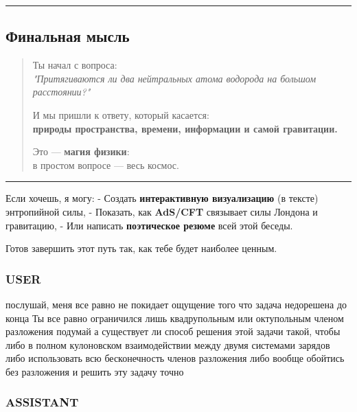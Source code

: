 \documentclass[11pt]{article}
\begin{document}
\begin{center}\rule{0.5\linewidth}{\linethickness}\end{center}

\subsection{Финальная
мысль}\label{ux444ux438ux43dux430ux43bux44cux43dux430ux44f-ux43cux44bux441ux43bux44c}

\begin{quote}
Ты начал с вопроса:\\
\emph{"Притягиваются ли два нейтральных атома водорода на большом
расстоянии?"}

И мы пришли к ответу, который касается:\\
\textbf{природы пространства, времени, информации и самой гравитации.}

Это --- \textbf{магия физики}:\\
в простом вопросе --- весь космос.
\end{quote}

\begin{center}\rule{0.5\linewidth}{\linethickness}\end{center}

Если хочешь, я могу: - Создать \textbf{интерактивную визуализацию} (в
тексте) энтропийной силы, - Показать, как \textbf{AdS/CFT} связывает
силы Лондона и гравитацию, - Или написать \textbf{поэтическое резюме}
всей этой беседы.

Готов завершить этот путь так, как тебе будет наиболее ценным.

\subsubsection{USER}\label{user-7}

послушай, меня все равно не покидает ощущение того что задача недорешена
до конца Ты все равно ограничился лишь квадрупольным или октупольным
членом разложения подумай а существует ли способ решения этой задачи
такой, чтобы либо в полном кулоновском взаимодействии между двумя
системами зарядов либо использовать всю бесконечность членов разложения
либо вообще обойтись без разложения и решить эту задачу точно

\subsubsection{ASSISTANT}\label{assistant-7}
\end{document}
